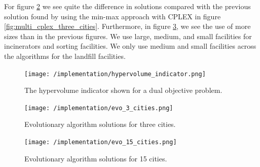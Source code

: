 \documentclass[mscthesis, 11pt]{usiinfthesis}
\theoremstyle{newdefinition}
\begin{document}
For figure \ref{fig:evo_3_cities} we see quite the difference in solutions compared with the previous solution found by using the min-max approach with CPLEX in figure \ref{fig:multi_cplex_three_cities}. Furthermore, in figure \ref{fig:evo_15_cities}, we see the use of more sizes than in the previous figures. We use large, medium, and small facilities for incinerators and sorting facilities. We only use medium and small facilities across the algorithms for the landfill facilities.
\begin{table}[ht]
\centering
{}
\caption{Parameters used for the evolutionary algorithms, for large and small scale problems.}
\label{tab:evo-params}
\end{table}


\begin{table}[ht]
\centering
{}
\caption{Parameters used for the termination criterion, for small scale and large scale problems.}
\label{tab:term-criterion_params}
\end{table}
\begin{figure}[ht]
    \centering
    \texttt{[image: /implementation/hypervolume\_indicator.png]}
    \caption{The hypervolume indicator shown for a dual objective problem.}
    \label{fig:hv_indicator}
\end{figure}
\begin{figure}
    \centering
    \texttt{[image: /implementation/evo\_3\_cities.png]}
    \caption{Evolutionary algorithm solutions for three cities.}
    \label{fig:evo_3_cities}
\end{figure}
\begin{figure}
    \centering
    \texttt{[image: /implementation/evo\_15\_cities.png]}
    \caption{Evolutionary algorithm solutions for 15 cities.}
    \label{fig:evo_15_cities}
\end{figure}
\clearpage
\end{document}
